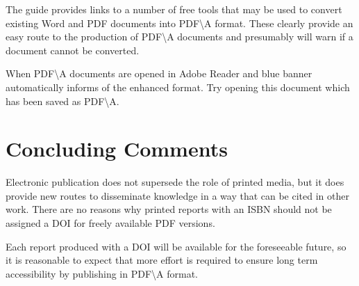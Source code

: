 \documentclass{article}
\begin{document}
 The guide provides links to a number of free tools that may be used to convert existing Word and PDF documents into PDF\textbackslash A format. These clearly provide an easy route to the production of PDF\textbackslash A documents and presumably will warn if a document cannot be converted. 
 
 When PDF\textbackslash A documents are opened in Adobe Reader and blue banner automatically informs of the enhanced format. Try opening this document which has been saved as PDF\textbackslash A.
 
 \section{Concluding Comments}
 
Electronic publication does not supersede the role of printed media, but it does provide new routes to disseminate knowledge in a way that can be cited in other work. There are no reasons why printed reports with an ISBN should not be assigned a DOI for freely available PDF versions.

Each report produced with a DOI will be available for the foreseeable future, so it is reasonable to expect that more effort is required to ensure long term accessibility by publishing in PDF\textbackslash A format.





\end{document}
